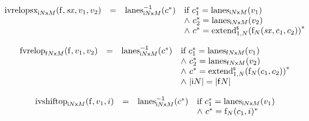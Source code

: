 $$
\begin{array}[t]{@{}lcl@{}l@{}}
{{\mathrm{ivrelopsx}}}_{{{\mathsf{i}}{N}}{\mathsf{x}}{M}}({\mathrm{f}}, {\mathit{sx}}, v_1, v_2) & = & {{{{\mathrm{lanes}}}_{{{\mathsf{i}}{N}}{\mathsf{x}}{M}}^{{-1}}}}{({c^\ast})} & \quad
\begin{array}[t]{@{}l@{}}
\mbox{if}~ {c_1^\ast} = {{\mathrm{lanes}}}_{{{\mathsf{i}}{N}}{\mathsf{x}}{M}}(v_1) \\
{\land}~ {c_2^\ast} = {{\mathrm{lanes}}}_{{{\mathsf{i}}{N}}{\mathsf{x}}{M}}(v_2) \\
{\land}~ {c^\ast} = {{{{{\mathrm{extend}}}_{1, N}^{\mathsf{s}}}}{({{\mathrm{f}}}_{N}({\mathit{sx}}, c_1, c_2))}^\ast} \\
\end{array} \\
\end{array}
$$

$$
\begin{array}[t]{@{}lcl@{}l@{}}
{{\mathrm{fvrelop}}}_{{{\mathsf{f}}{N}}{\mathsf{x}}{M}}({\mathrm{f}}, v_1, v_2) & = & {{{{\mathrm{lanes}}}_{{{\mathsf{i}}{N}}{\mathsf{x}}{M}}^{{-1}}}}{({c^\ast})} & \quad
\begin{array}[t]{@{}l@{}}
\mbox{if}~ {c_1^\ast} = {{\mathrm{lanes}}}_{{{\mathsf{f}}{N}}{\mathsf{x}}{M}}(v_1) \\
{\land}~ {c_2^\ast} = {{\mathrm{lanes}}}_{{{\mathsf{f}}{N}}{\mathsf{x}}{M}}(v_2) \\
{\land}~ {c^\ast} = {{{{{\mathrm{extend}}}_{1, N}^{\mathsf{s}}}}{({{\mathrm{f}}}_{N}(c_1, c_2))}^\ast} \\
{\land}~ {|{\mathsf{i}}{N}|} = {|{\mathsf{f}}{N}|} \\
\end{array} \\
\end{array}
$$

\vspace{1ex}

$$
\begin{array}[t]{@{}lcl@{}l@{}}
{{\mathrm{ivshiftop}}}_{{{\mathsf{i}}{N}}{\mathsf{x}}{M}}({\mathrm{f}}, v_1, i) & = & {{{{\mathrm{lanes}}}_{{{\mathsf{i}}{N}}{\mathsf{x}}{M}}^{{-1}}}}{({c^\ast})} & \quad
\begin{array}[t]{@{}l@{}}
\mbox{if}~ {c_1^\ast} = {{\mathrm{lanes}}}_{{{\mathsf{i}}{N}}{\mathsf{x}}{M}}(v_1) \\
{\land}~ {c^\ast} = {{{\mathrm{f}}}_{N}(c_1, i)^\ast} \\
\end{array} \\
\end{array}
$$

